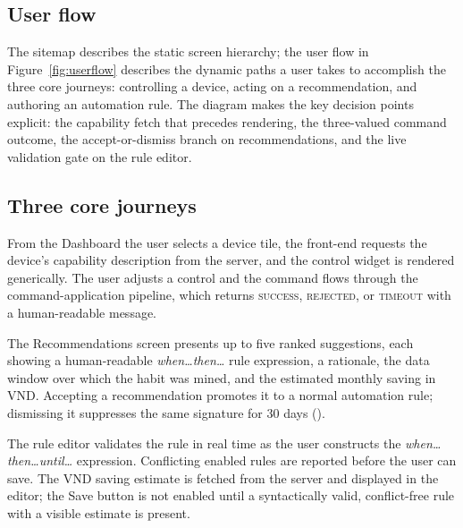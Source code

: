 \subsection{User flow}

The sitemap describes the static screen hierarchy; the user flow in
Figure~\ref{fig:userflow} describes the dynamic paths a user takes to accomplish the
three core journeys: controlling a device, acting on a recommendation, and authoring an
automation rule.  The diagram makes the key decision points explicit: the capability
fetch that precedes rendering, the three-valued command outcome, the accept-or-dismiss
branch on recommendations, and the live validation gate on the rule editor.


\subsection{Three core journeys}

\begin{description}[style=nextline]
  \item[Journey 1 — Monitor and control a device.]
    From the Dashboard the user selects a device tile, the front-end requests the
    device's capability description from the server, and the control widget is rendered
    generically.  The user adjusts a control and the command flows through the
    command-application pipeline, which returns \textsc{success},
    \textsc{rejected}, or \textsc{timeout} with a human-readable message.

  \item[Journey 2 — Review and act on a recommendation.]
    The Recommendations screen presents up to five ranked suggestions, each showing a
    human-readable \emph{when\ldots then\ldots} rule expression, a rationale, the data window
    over which the habit was mined, and the estimated monthly saving in VND\@.
    Accepting a recommendation promotes it to a normal automation rule; dismissing it
    suppresses the same signature for 30 days ().

  \item[Journey 3 — Author an automation rule.]
    The rule editor validates the rule in real time as the user constructs the
    \emph{when\ldots then\ldots until\ldots} expression.  Conflicting enabled rules
    are reported before the user can save.  The VND saving estimate is fetched from the
    server and displayed in the editor; the Save button is not enabled until a
    syntactically valid, conflict-free rule with a visible estimate is present.
\end{description}

